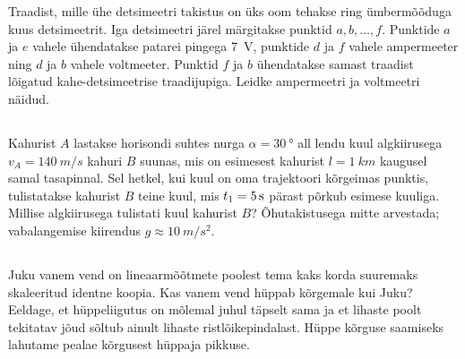 \documentclass[10pt]{article}
\begin{document}
Traadist, mille ühe detsimeetri takistus on üks oom tehakse ring ümbermõõduga kuus detsimeetrit. Iga detsimeetri järel märgitakse punktid $a, b, \ldots, f$. Punktide $a$ ja $e$ vahele ühendatakse patarei pingega \SI{7}{V}, punktide $d$ ja $f$ vahele ampermeeter ning $d$ ja $b$ vahele voltmeeter. Punktid $f$ ja $b$ ühendatakse samast traadist lõigatud kahe-detsimeetrise traadijupiga. Leidke ampermeetri ja voltmeetri näidud.
\probend
\bigskip
\newpage\subsection{\protect{}}


Kahurist $A$ lastakse horisondi suhtes nurga $\alpha=\SI{30}{\degree}$ all lendu kuul algkiirusega $v_A=\SI{140}{m/s}$ kahuri $B$ suunas, mis on esimesest kahurist $l=\SI{1}{km}$ kaugusel samal tasapinnal. Sel hetkel, kui kuul on oma trajektoori kõrgeimas punktis, tulistatakse kahurist $B$ teine kuul, mis $t_1=\SI 5s$ pärast põrkub  esimese kuuliga. Millise algkiirusega tulistati kuul kahurist $B$? Õhutakistusega mitte arvestada; vabalangemise kiirendus $g\approx\SI{10}{m/s^2}$.
\probend
\bigskip
\newpage\subsection{\protect{}}


Juku vanem vend on lineaarmõõtmete poolest tema kaks korda suuremaks skaleeritud identne koopia. Kas vanem vend hüppab kõrgemale kui Juku? Eeldage, et hüppeliigutus on mõlemal juhul täpselt sama ja et lihaste poolt tekitatav jõud sõltub ainult lihaste ristlõikepindalast. Hüppe kõrguse saamiseks lahutame pealae kõrgusest hüppaja pikkuse.
\probend
\bigskip
\newpage\subsection{\protect{}}

\end{document}
